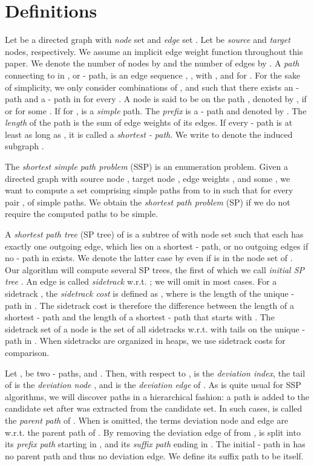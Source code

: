 \documentclass[runningheads,a4paper]{llncs}
\begin{document}
\section{Definitions}
\label{sec:definitions}

Let  be a directed graph with \emph{node} set  and \emph{edge} set .
Let  be \emph{source} and \emph{target} nodes, respectively.
We assume an implicit edge weight function  throughout this paper.
We denote the number of nodes  by  and the number of edges  by .
A \emph{path} connecting  to  in , or - path, is an edge sequence , , with ,  and  for .
For the sake of simplicity, we only consider combinations of ,  and  such that there exists an - path and a - path in  for every .
A node  is said to be on the path , denoted by , if  or  for some .
If  for ,  is a \emph{simple} path.
The \emph{prefix}  is a - path and denoted by .
The \emph{length}  of the path  is the sum of edge weights of its edges.
If every - path is at least as long as , it is called a \emph{shortest - path}.
We write  to denote the induced subgraph .

The \emph{ shortest simple path problem} (SSP) is an enumeration problem.
Given a directed graph  with source node , target node , edge weights , and some , we want to compute a set  comprising  simple paths from  to  in  such that  for every pair ,  of simple paths.
We obtain the \emph{ shortest path problem} (SP) if we do not require the computed paths to be simple.

A \emph{shortest path tree} (SP tree)  of  is a subtree of  with node set  such that each  has exactly one outgoing edge, which lies on a shortest - path, or no outgoing edges if no - path in  exists.
We denote the latter case by  even if  is in the node set of .
Our algorithm will compute several SP trees, the first of which we call \emph{initial SP tree} .
An edge  is called \emph{sidetrack} w.r.t. ; we will omit  in most cases.
For a sidetrack , the \emph{sidetrack cost}  is defined as , where  is the length of the unique - path in .
The sidetrack cost is therefore the difference between the length of a shortest - path and the length of a shortest - path that starts with .
The sidetrack set  of a node  is the set of all sidetracks w.r.t.  with tails on the unique - path in .
When sidetracks are organized in heaps, we use sidetrack costs for comparison.

Let ,  be two - paths, and .
Then, with respect to ,  is the \emph{deviation index}, the tail of  is the \emph{deviation node} , and  is the \emph{deviation edge} of .
As is quite usual for SSP algorithms, we will discover paths in a hierarchical fashion: a path  is added to the candidate set after  was extracted from the candidate set.
In such cases,  is called the \emph{parent path} of .
When  is omitted, the terms deviation node and edge are w.r.t. the parent path of .
By removing the deviation edge of  from ,  is split into its \emph{prefix path}  starting in , and its \emph{suffix path}  ending in .
The initial - path  in  has no parent path and thus no deviation edge.
We define its suffix path to be  itself.
\end{document}
